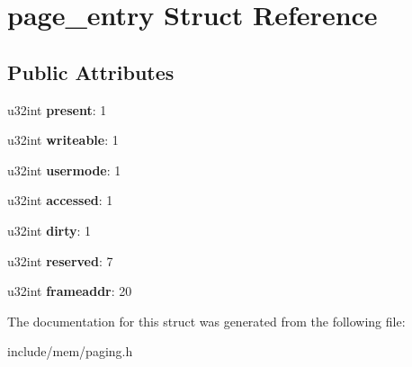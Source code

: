 \hypertarget{structpage__entry}{}\section{page\+\_\+entry Struct Reference}
\label{structpage__entry}
\subsection*{Public Attributes}
\begin{DoxyCompactItemize}
\item 
u32int {\bfseries present}\+: 1\hypertarget{structpage__entry_a34148a94af9bfabbb8c4f00f9865dfee}{}\label{structpage__entry_a34148a94af9bfabbb8c4f00f9865dfee}

\item 
u32int {\bfseries writeable}\+: 1\hypertarget{structpage__entry_a2ea8d7684fe45772b6acba70d46e41d9}{}\label{structpage__entry_a2ea8d7684fe45772b6acba70d46e41d9}

\item 
u32int {\bfseries usermode}\+: 1\hypertarget{structpage__entry_a2beafd3900a1f36f09af9c35a9a14f18}{}\label{structpage__entry_a2beafd3900a1f36f09af9c35a9a14f18}

\item 
u32int {\bfseries accessed}\+: 1\hypertarget{structpage__entry_a8b4097e0cee08d028182b11bd1f73f92}{}\label{structpage__entry_a8b4097e0cee08d028182b11bd1f73f92}

\item 
u32int {\bfseries dirty}\+: 1\hypertarget{structpage__entry_ab3b5e22c6146f227a26bdec64e63f4b0}{}\label{structpage__entry_ab3b5e22c6146f227a26bdec64e63f4b0}

\item 
u32int {\bfseries reserved}\+: 7\hypertarget{structpage__entry_af6d963f09b01571b107e6f505050c0e5}{}\label{structpage__entry_af6d963f09b01571b107e6f505050c0e5}

\item 
u32int {\bfseries frameaddr}\+: 20\hypertarget{structpage__entry_a68a6dc54a7ab6f7fb1a068476190bf67}{}\label{structpage__entry_a68a6dc54a7ab6f7fb1a068476190bf67}

\end{DoxyCompactItemize}


The documentation for this struct was generated from the following file\+:\begin{DoxyCompactItemize}
\item 
include/mem/paging.\+h\end{DoxyCompactItemize}
